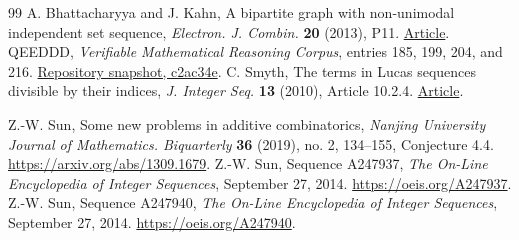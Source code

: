 \documentclass[11pt,a4paper]{article}
\theoremstyle{remark}\newtheorem{remark}[theorem]{Remark}
\numberwithin{equation}{section}
\begin{document}
\begin{thebibliography}{99}
 A. Bhattacharyya and J. Kahn, A bipartite graph with non-unimodal independent set sequence, \emph{Electron. J. Combin.} \textbf{20} (2013), P11. \href{https://doi.org/10.37236/3034}{Article}.
 QEEDDD, \emph{Verifiable Mathematical Reasoning Corpus}, entries 185, 199, 204, and 216. \href{https://github.com/QEEDDD/Verifiable-Mathematical-Reasoning-Corpus/tree/c2ac34ea4622778187173f41bb1996deee8081b7}{Repository snapshot, c2ac34e}.
 C. Smyth, The terms in Lucas sequences divisible by their indices, \emph{J. Integer Seq.} \textbf{13} (2010), Article 10.2.4. \href{https://cs.uwaterloo.ca/journals/JIS/VOL13/Smyth/smyth2.html}{Article}.

Z.-W. Sun, Some new problems in additive combinatorics,
\emph{Nanjing University Journal of Mathematics. Biquarterly}
\textbf{36} (2019), no. 2, 134--155, Conjecture 4.4.
\url{https://arxiv.org/abs/1309.1679}.
Z.-W. Sun, Sequence A247937, \emph{The On-Line Encyclopedia of
Integer Sequences}, September 27, 2014. \url{https://oeis.org/A247937}.
Z.-W. Sun, Sequence A247940, \emph{The On-Line Encyclopedia of
Integer Sequences}, September 27, 2014. \url{https://oeis.org/A247940}.

\end{thebibliography}
\end{document}
